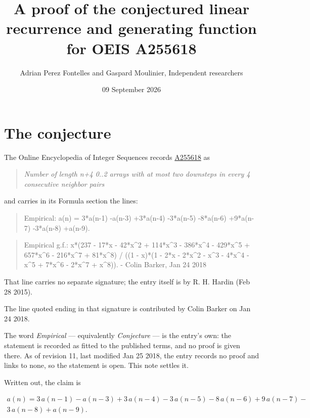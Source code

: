 \documentclass[11pt]{article}
\title{A proof of the conjectured linear recurrence and generating function for OEIS A255618}
\author{Adrian Perez Fontelles and Gaspard Moulinier, Independent researchers}
\date{09 September 2026}
\theoremstyle{definition}
\begin{document}
\maketitle
\section{The conjecture}

The Online Encyclopedia of Integer Sequences records \href{https://oeis.org/A255618}{A255618} as

\begin{quote}\itshape Number of length n+4 0..2 arrays with at most two downsteps in every 4 consecutive neighbor pairs\end{quote}

and carries in its Formula section the lines:

\begin{quote}\ttfamily Empirical: a(n) = 3*a(n-1) -a(n-3) +3*a(n-4) -3*a(n-5) -8*a(n-6) +9*a(n-7) -3*a(n-8) +a(n-9).\end{quote}

\begin{quote}\ttfamily Empirical g.f.: x*(237 - 17*x - 42*x\textasciicircum{}2 + 114*x\textasciicircum{}3 - 386*x\textasciicircum{}4 - 429*x\textasciicircum{}5 + 657*x\textasciicircum{}6 - 216*x\textasciicircum{}7 + 81*x\textasciicircum{}8) / ((1 - x)*(1 - 2*x - 2*x\textasciicircum{}2 - x\textasciicircum{}3 - 4*x\textasciicircum{}4 - x\textasciicircum{}5 + 7*x\textasciicircum{}6 - 2*x\textasciicircum{}7 + x\textasciicircum{}8)). - Colin Barker, Jan 24 2018\end{quote}

That line carries no separate signature; the entry itself is by R. H. Hardin (Feb 28 2015).

The line quoted ending in that signature is contributed by Colin Barker on Jan 24 2018.

The word {\itshape Empirical} --- equivalently {\itshape Conjecture} --- is the entry's own: the statement is recorded as fitted to the published terms, and no proof is given there. As of revision 11, last modified Jan 25 2018, the entry records no proof and links to none, so the statement is open. This note settles it.

Written out, the claim is

\begin{multline*} a(n) = 3\,a(n-1) - a(n-3) + 3\,a(n-4) - 3\,a(n-5) - 8\,a(n-6) + 9\,a(n-7) - \\ 3\,a(n-8) + a(n-9). \end{multline*}
\end{document}
